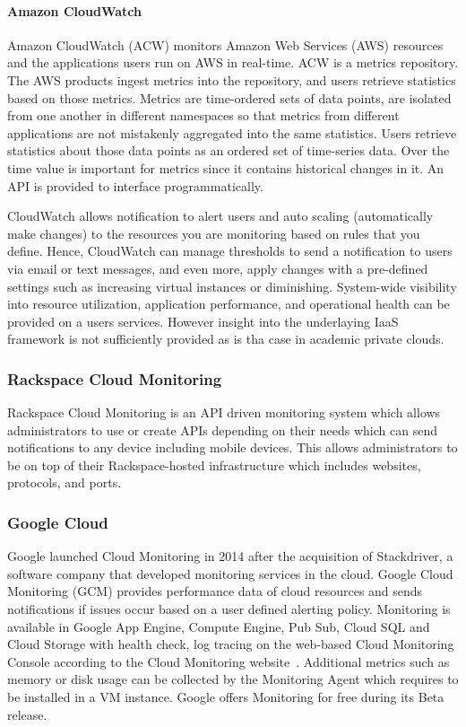 \documentclass{sig-alternate-05-2015}
\begin{document}
\paragraph{Amazon CloudWatch}

Amazon CloudWatch (ACW) \cite{cloudwatch2013monitoring} monitors Amazon Web
Services (AWS) resources and the applications users run on AWS in real-time.
ACW is a metrics repository. The AWS products ingest metrics into the
repository, and users retrieve statistics based on those metrics.  Metrics are
time-ordered sets of data points, are isolated from one another in different
namespaces so that metrics from different applications are not mistakenly
aggregated into the same statistics. Users retrieve statistics about those data
points as an ordered set of time-series data. Over the time value is important
for metrics since it contains historical changes in it. An API is provided to
interface programmatically.

CloudWatch allows notification to alert users and auto scaling
(automatically make changes) to the resources you are monitoring based
on rules that you define. Hence, CloudWatch can manage thresholds
to send a notification to users via email or text messages, and even
more, apply changes with a pre-defined settings such as increasing
virtual instances or diminishing. System-wide visibility into
resource utilization, application performance, and operational health
can be provided on a users services. However insight into the
underlaying IaaS framework is not sufficiently provided as is tha case
in academic private clouds.

\subsubsection{Rackspace Cloud Monitoring}

Rackspace Cloud Monitoring is an API driven monitoring system which
allows administrators to use or create APIs depending on their needs
which can send notifications to any device including mobile
devices. This allows administrators to be on top of their
Rackspace-hosted infrastructure which includes websites, protocols,
and ports.

\subsubsection{Google Cloud}
Google launched Cloud Monitoring in 2014 after the acquisition of Stackdriver,
a software company that developed monitoring services in the cloud. Google
Cloud Monitoring (GCM) provides performance data of cloud resources and sends
notifications if issues occur based on a user defined alerting policy.
Monitoring is available in Google App Engine, Compute Engine, Pub Sub, Cloud
SQL and Cloud Storage with health check, log tracing on the web-based Cloud
Monitoring Console according to the Cloud Monitoring website~\cite{GCM}.
Additional metrics such as memory or disk usage can be collected by the
Monitoring Agent which requires to be installed in a VM instance. Google offers
Monitoring for free during its Beta release.
\end{document}
